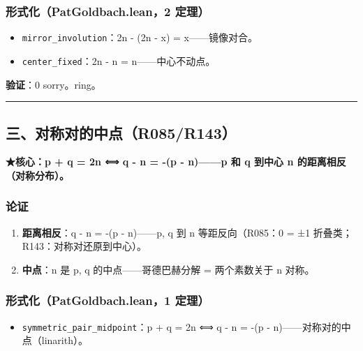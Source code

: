 \documentclass[
]{article}
\providecommand{\tightlist}{%
  \setlength{\itemsep}{0pt}\setlength{\parskip}{0pt}}
\begin{document}
\subsubsection{形式化（PatGoldbach.lean，2
定理）}\label{ux5f62ux5f0fux5316patgoldbach.lean2-ux5b9aux7406}

\begin{itemize}
\tightlist
\item
  \texttt{mirror\_involution}：2n - (2n - x) = x------镜像对合。
\item
  \texttt{center\_fixed}：2n - n = n------中心不动点。
\end{itemize}

\textbf{验证}：0 sorry。ring。

\begin{center}\rule{0.5\linewidth}{0.5pt}\end{center}

\subsection{三、对称对的中点（R085/R143）}\label{ux4e09ux5bf9ux79f0ux5bf9ux7684ux4e2dux70b9r085r143}

\textbf{★核心：p + q = 2n ⟺ q - n = -(p - n)------p 和 q 到中心 n
的距离相反（对称分布）。}

\subsubsection{论证}\label{ux8bbaux8bc1-2}

\begin{enumerate}
\def\labelenumi{\arabic{enumi}.}
\tightlist
\item
  \textbf{距离相反}：q - n = -(p - n)------p, q 到 n 等距反向（R085：0 =
  ±1 折叠类；R143：对称对还原到中心）。
\item
  \textbf{中点}：n 是 p, q 的中点------哥德巴赫分解 = 两个素数关于 n
  对称。
\end{enumerate}

\subsubsection{形式化（PatGoldbach.lean，1
定理）}\label{ux5f62ux5f0fux5316patgoldbach.lean1-ux5b9aux7406-1}

\begin{itemize}
\tightlist
\item
  \texttt{symmetric\_pair\_midpoint}：p + q = 2n ⟺ q - n = -(p -
  n)------对称对的中点（linarith）。
\end{itemize}
\end{document}
